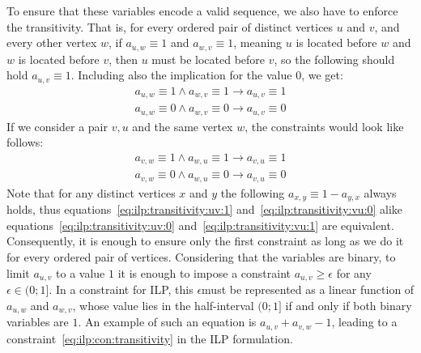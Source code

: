 To ensure that these variables encode a valid sequence, we also have to enforce the transitivity. That is, for every ordered pair of distinct vertices \(u\) and \(v\), and every other vertex \(w\), if \(a_{u, w} \equiv 1\) and \(a_{w, v} \equiv 1\), meaning \(u\) is located before \(w\) and \(w\) is located before \(v\), then \(u\) must be located before \(v\), so the following should hold \(a_{u, v} \equiv 1\). Including also the implication for the value \(0\), we get:
\begin{align}
    a_{u, w} \equiv 1 \land a_{w, v} \equiv 1 \longrightarrow a_{u, v} \equiv 1 \label{eq:ilp:transitivity:uv:1}\\
    a_{u, w} \equiv 0 \land a_{w, v} \equiv 0 \longrightarrow a_{u, v} \equiv 0 \label{eq:ilp:transitivity:uv:0}
\end{align}
If we consider a pair \(v, u\) and the same vertex \(w\),  the constraints would look like follows:
\begin{align}
    a_{v, w} \equiv 1 \land a_{w, u} \equiv 1 \longrightarrow a_{v, u} \equiv 1 \label{eq:ilp:transitivity:vu:1} \\
    a_{v, w} \equiv 0 \land a_{w, u} \equiv 0 \longrightarrow a_{v, u} \equiv 0 \label{eq:ilp:transitivity:vu:0}
\end{align}
Note that for any distinct vertices \(x\) and \(y\) the following \(a_{x, y} \equiv 1 - a_{y, x}\) always holds, thus equations~\eqref{eq:ilp:transitivity:uv:1} and~\eqref{eq:ilp:transitivity:vu:0} alike equations~\eqref{eq:ilp:transitivity:uv:0} and~\eqref{eq:ilp:transitivity:vu:1} are equivalent. Consequently, it is enough to ensure only the first constraint as long as we do it for every ordered pair of vertices. Considering that the variables are binary, to limit \(a_{u, v}\) to a value \(1\) it is enough to impose a constraint \(a_{u, v} \geqslant \epsilon\) for any \(\epsilon \in (0;1]\). In a constraint for ILP, this \(\epsilon\)must be represented as a linear function of \(a_{u, w}\) and \(a_{w, v}\), whose value lies in the half-interval \((0;1]\) if and only if both binary variables are \(1\). An example of such an equation is \(a_{u, v} + a_{v, w} - 1\), leading to a constraint~\eqref{eq:ilp:con:transitivity} in the ILP formulation.

